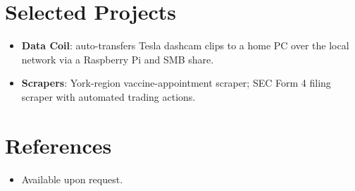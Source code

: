 \documentclass[11pt,a4paper,sans]{moderncv}
\begin{document}

\section{Selected Projects}
\vspace{1pt}
\begin{itemize}
\item \textbf{Data Coil}: auto-transfers Tesla dashcam clips to a home PC over the local network via a Raspberry Pi and SMB share.
\item \textbf{Scrapers}: York-region vaccine-appointment scraper; SEC Form 4 filing scraper with automated trading actions.
\end{itemize}


\section{References}
\vspace{1pt}
\begin{itemize}
\item{Available upon request.}
\end{itemize}
\end{document}
